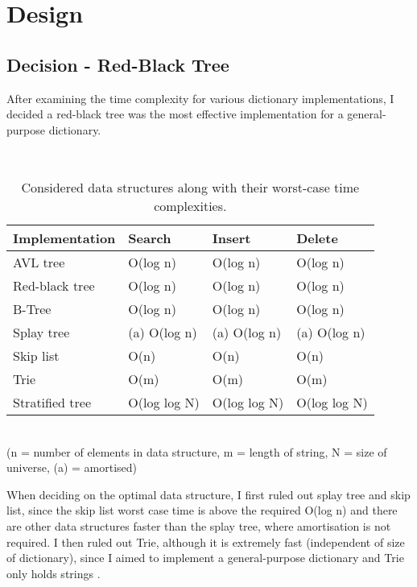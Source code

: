 \section{Design}

\subsection{Decision - Red-Black Tree}

After examining the time complexity for various dictionary implementations, I decided a red-black tree was the most effective implementation for a general-purpose dictionary.

\\

\begin{table}[hp]
\centering
\begin{tabular}{| l | l | l | l |}
\hline
\textbf{Implementation} & \textbf{Search} & \textbf{Insert} & \textbf{Delete} \\ \hline
AVL tree & O(log n) & O(log n) & O(log n) \\ \hline
\color{red} Red-black tree & \color{red} O(log n) & \color{red} O(log n) & \color{red} O(log n) \\ \hline
B-Tree & O(log n) & O(log n) & O(log n) \\ \hline
Splay tree & (a) O(log n) & (a) O(log n) & (a) O(log n) \\ \hline
Skip list & O(n) & O(n) & O(n) \\ \hline
Trie & O(m) & O(m) & O(m) \\ \hline
Stratified tree & O(log log N) & O(log log N) & O(log log N) \\ \hline
\end{tabular}
\\{\tiny{(n = number of elements in data structure, m = length of string, N = size of universe, (a) = amortised)}}\\
\caption{Considered data structures along with their worst-case time complexities.}
\end{table}

When deciding on the optimal data structure, I first ruled out splay tree and skip list, since the skip list worst case time is above the required O(log n) and there are other data structures faster than the splay tree, where amortisation is not required. I then ruled out Trie, although it is extremely fast (independent of size of dictionary), since I aimed to implement a general-purpose dictionary and Trie only holds strings \parencite{trie}.

